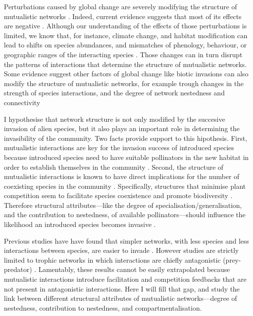 \documentclass[a4paper]{article}
\begin{document}
Perturbations caused by global change are severely modifying the structure of mutualistic networks \cite{Burkle2013a}.
Indeed, current evidence suggests that most of its effects are negative \cite{Tylianakis2008, Tylianakis2010}.
Although our understanding of the effects of those perturbations is limited, we know that, for instance, climate change, and habitat modification can lead to shifts on species abundances, and mismatches of phenology, behaviour, or geographic ranges of the interacting species \cite{Memmott2007, Tylianakis2008, Hegland2009, Burkle2013a}.
Those changes can in turn disrupt the patterns of interactions that determine the structure of mutualistic networks.
Some evidence suggest other factors of global change like biotic invasions can also modify the structure of mutualistic networks, for example trough changes in the strength of species interactions, and the degree of network nestedness and connectivity \cite{Olesen2002, Aizen2008, Bartomeus2008, Vila2009, Traveset2013}

I hypothesise that network structure is not only modified by the succesive invasion of alien species, but it also plays an important role in determining the invasibility of the community.
Two facts provide support to this hipothesis.
First, mutualistic interactions are key for the invasion success of introduced species because introduced species need to have suitable pollinators in the new habitat in order to establish themselves in the community \cite{Richardson2000, Sargent2008}.
Second, the structure of mutualistic interactions is known to have direct implications for the number of coexisting species in the community \cite{Moeller2004, Bascompte2006, Bascompte2007, Bastolla2009}.
Specifically, structures that minimise plant competition seem to facilitate species coexistence and promote biodiversity \cite{Bastolla2009}.
Therefore structural attributes---like the degree of specialisation/generalisation, and the contribution to nestedness, of available pollinators---should influence the likelihood an introduced species becomes invasive \cite{Stouffer2014}.

Previous studies have have found that simpler networks, with less species and less interactions between species, are easier to invade \cite{Romanuk2009, Galiana2014}.
However studies are strictly limited to trophic networks in which interactions are chiefly antagonistic (prey-predator) \cite{Romanuk2009, Baiser2010, Galiana2014}.
Lamentably, these results cannot be easily extrapolated because mutualistic interactions introduce facilitation and competition feedbacks that are not present in antagonistic interactions.
Here I will fill that gap, and study the link between different structural attributes of mutualistic networks---degree of nestedness, contribution to nestedness, and compartmentalisation.
\end{document}
